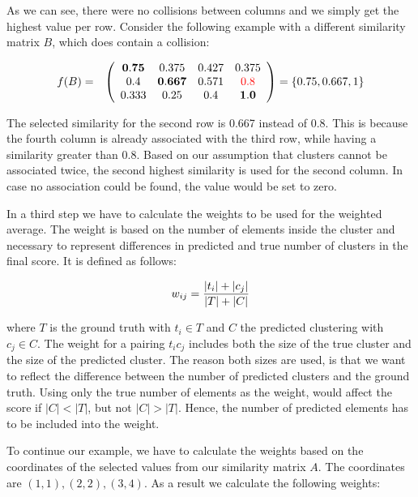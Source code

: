 As we can see, there were no collisions between columns and we simply get the highest value per row.
Consider the following example with a different similarity matrix $B$, which does contain a collision:

\begin{gather*}
    \begin{array}{rcl}
        f(B) = & \left(\begin{array}{cccc}
            \mathbf{0.75} & 0.375 & 0.427 & 0.375 \\
            0.4 & \mathbf{0.667} & 0.571 & \textcolor{red}{0.8} \\
            0.333 &  0.25 & 0.4 & \mathbf{1.0} \end{array}\right)
            = \{0.75, 0.667, 1\}
    \end{array}
\end{gather*}

The selected similarity for the second row is 0.667 instead of 0.8.
This is because the fourth column is already associated with the third row, while having a similarity greater than 0.8.
Based on our assumption that clusters cannot be associated twice,
the second highest similarity is used for the second column.
In case no association could be found, the value would be set to zero.

In a third step we have to calculate the weights to be used for the weighted average.
The weight is based on the number of elements inside the cluster
and necessary to represent differences in predicted and true number of clusters in the final score.
It is defined as follows:

\begin{equation}
    \label{equ:weight}
        w_{ij} = \frac{|t_i| + |c_j|}{|T|+|C|} \\
\end{equation}

where $T$ is the ground truth with $t_i \in T$ and $C$ the predicted clustering with  $c_j \in C$.
The weight for a pairing $t_ic_j$ includes both the size of the true cluster
and the size of the predicted cluster.
The reason both sizes are used,
is that we want to reflect the difference between the number of predicted clusters and the ground truth.
Using only the true number of elements as the weight, would affect the score if $|C| < |T|$, but not $|C| > |T|$.
Hence, the number of predicted elements has to be included into the weight.

To continue our example,
we have to calculate the weights based on the coordinates of the selected values from our similarity matrix $A$.
The coordinates are $(1,1), (2,2), (3,4)$.
As a result we calculate the following weights:

